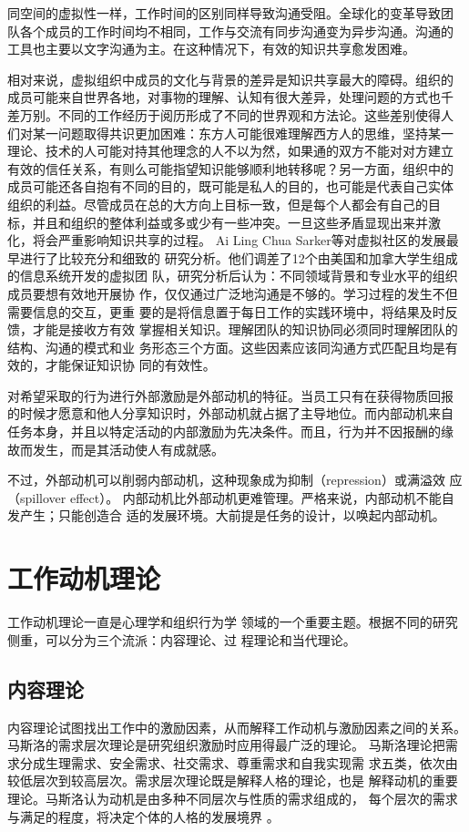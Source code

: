 \documentclass[12pt,a4paper]{ctexart}
\begin{document}
同空间的虚拟性一样，工作时间的区别同样导致沟通受阻。全球化的变革导致团
队各个成员的工作时间均不相同，工作与交流有同步沟通变为异步沟通。沟通的
工具也主要以文字沟通为主。在这种情况下，有效的知识共享愈发困难。

相对来说，虚拟组织中成员的文化与背景的差异是知识共享最大的障碍。组织的
成员可能来自世界各地，对事物的理解、认知有很大差异，处理问题的方式也千
差万别。不同的工作经历于阅历形成了不同的世界观和方法论。这些差别使得人
们对某一问题取得共识更加困难：东方人可能很难理解西方人的思维，坚持某一
理论、技术的人可能对持其他理念的人不以为然，如果通的双方不能对对方建立
有效的信任关系，有则么可能指望知识能够顺利地转移呢？另一方面，组织中的
成员可能还各自抱有不同的目的，既可能是私人的目的，也可能是代表自己实体
组织的利益。尽管成员在总的大方向上目标一致，但是每个人都会有自己的目
标，并且和组织的整体利益或多或少有一些冲突。一旦这些矛盾显现出来并激
化，将会严重影响知识共享的过程。
Ai Ling Chua
Sarker等\cite{sarker2000uvt}对虚拟社区的发展最早进行了比较充分和细致的
研究分析。他们调差了12个由美国和加拿大学生组成的信息系统开发的虚拟团
队，研究分析后认为：不同领域背景和专业水平的组织成员要想有效地开展协
作，仅仅通过广泛地沟通是不够的。学习过程的发生不但需要信息的交互，更重
要的是将信息置于每日工作的实践环境中，将结果及时反馈，才能是接收方有效
掌握相关知识。理解团队的知识协同必须同时理解团队的结构、沟通的模式和业
务形态三个方面。这些因素应该同沟通方式匹配且均是有效的，才能保证知识协
同的有效性。




对希望采取的行为进行外部激励是外部动机的特征。当员工只有在获得物质回报
的时候才愿意和他人分享知识时，外部动机就占据了主导地位。而内部动机来自
任务本身，并且以特定活动的内部激励为先决条件。而且，行为并不因报酬的缘
故而发生，而是其活动使人有成就感。

不过，外部动机可以削弱内部动机，这种现象成为抑制（repression）或满溢效
应（spillover effect）。
内部动机比外部动机更难管理。严格来说，内部动机不能自发产生；只能创造合
适的发展环境。大前提是任务的设计，以唤起内部动机。
\cite{KaiMertins2003}

\section{工作动机理论}
工作动机理论一直是心理学和组织行为学
领域的一个重要主题。根据不同的研究侧重，可以分为三个流派：内容理论、过
程理论和当代理论。

\subsection{内容理论}
内容理论试图找出工作中的激励因素，从而解释工作动机与激励因素之间的关系。
马斯洛的需求层次理论是研究组织激励时应用得最广泛的理论。
马斯洛理论把需求分成生理需求、安全需求、社交需求、尊重需求和自我实现需
求五类，依次由较低层次到较高层次。需求层次理论既是解释人格的理论，也是
解释动机的重要理论。马斯洛认为动机是由多种不同层次与性质的需求组成的，
每个层次的需求与满足的程度，将决定个体的人格的发展境界
\cite{Maslow1943}。
\end{document}
